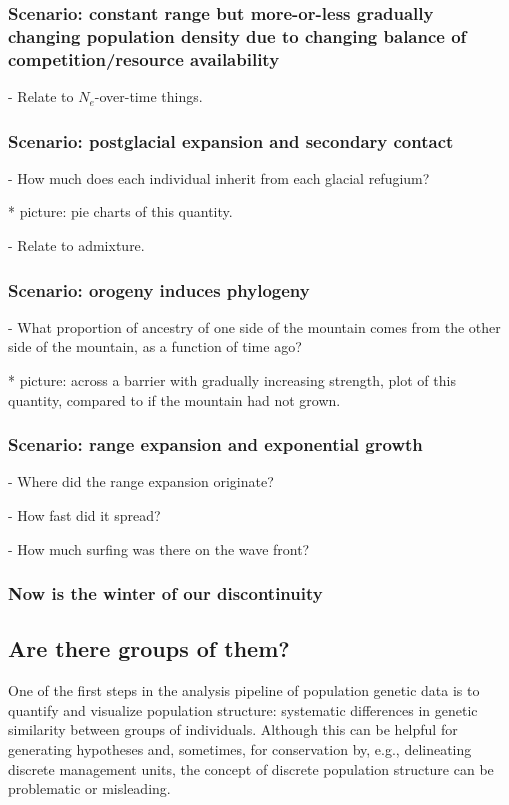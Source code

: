 \documentclass{ar-1col}
\begin{document}
\subsubsection{Scenario: constant range but more-or-less gradually changing population density due to changing balance of competition/resource availability}

        - Relate to $N_e$-over-time things.

\subsubsection{Scenario: postglacial expansion and secondary contact}

        - How much does each individual inherit from each glacial refugium?

            * picture: pie charts of this quantity.

        - Relate to admixture.

\subsubsection{Scenario: orogeny induces phylogeny}

        - What proportion of ancestry of one side of the mountain comes from the other side of the mountain,
            as a function of time ago?

            * picture: across a barrier with gradually increasing strength,
                plot of this quantity, compared to if the mountain had not grown.

\subsubsection{Scenario: range expansion and exponential growth}

        - Where did the range expansion originate?

        - How fast did it spread?

        - How much surfing was there on the wave front?

\subsubsection{Now is the winter of our discontinuity}

\subsection{Are there groups of them?}
One of the first steps in the analysis pipeline of population genetic data 
is to quantify and visualize population structure:
systematic differences in genetic similarity between groups of individuals.
Although this can be helpful for generating hypotheses 
and, sometimes, for conservation by, e.g., delineating discrete management units, 
the concept of discrete population structure 
can be problematic or misleading.
\end{document}
